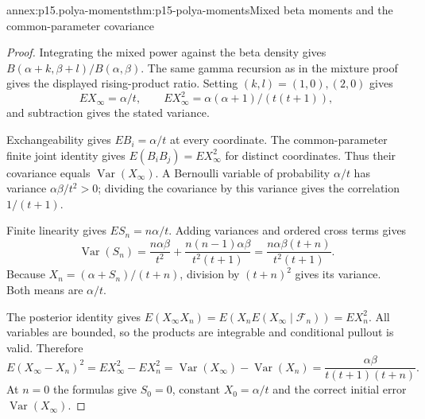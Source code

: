 \begin{annexitem}{annex:p15.polya-moments}{thm:p15-polya-moments}{Mixed beta moments and the common-parameter covariance}
\begin{proof}
Integrating the mixed power against the beta density gives
\(B(\alpha+k,\beta+l)/B(\alpha,\beta)\).
The same gamma recursion as in the mixture proof gives the displayed
rising-product ratio. Setting \((k,l)=(1,0),(2,0)\) gives
\[
 EX_\infty=\alpha/t,\qquad
 EX_\infty^2=\alpha(\alpha+1)/(t(t+1)),
\]
and subtraction gives the stated variance.

Exchangeability gives \(EB_i=\alpha/t\) at every coordinate.
The common-parameter finite joint identity gives
\(E(B_iB_j)=EX_\infty^2\) for distinct coordinates.
Thus their covariance equals \(\operatorname{Var}(X_\infty)\).
A Bernoulli variable of probability \(\alpha/t\) has variance
\(\alpha\beta/t^2>0\); dividing the covariance by this variance
gives the correlation \(1/(t+1)\).

Finite linearity gives \(ES_n=n\alpha/t\).
Adding variances and ordered cross terms gives
\[
 \operatorname{Var}(S_n)
   =\frac{n\alpha\beta}{t^2}
       +\frac{n(n-1)\alpha\beta}{t^2(t+1)}
   =\frac{n\alpha\beta(t+n)}{t^2(t+1)}.
\]
Because \(X_n=(\alpha+S_n)/(t+n)\), division by \((t+n)^2\)
gives its variance. Both means are \(\alpha/t\).

The posterior identity gives
\(E(X_\infty X_n)=E(X_n E(X_\infty\mid\mathcal F_n))=EX_n^2\).
All variables are bounded, so the products are integrable and
conditional pullout is valid. Therefore
\[
 E(X_\infty-X_n)^2
        =EX_\infty^2-EX_n^2
        =\operatorname{Var}(X_\infty)-\operatorname{Var}(X_n)
        =\frac{\alpha\beta}{t(t+1)(t+n)}.
\]
At \(n=0\) the formulas give \(S_0=0\), constant \(X_0=\alpha/t\)
and the correct initial error \(\operatorname{Var}(X_\infty)\).
\end{proof}
\end{annexitem}


